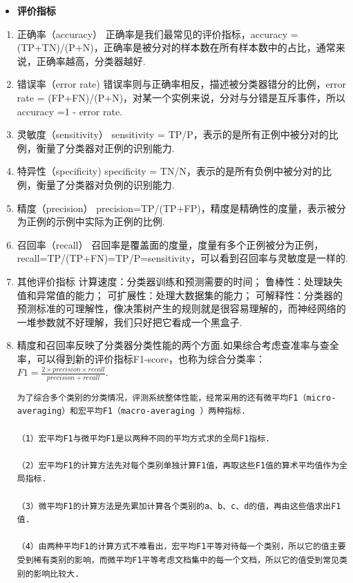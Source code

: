 \begin{itemize}
\item
  \textbf{评价指标}
\end{itemize}

\begin{enumerate}
\def\labelenumi{\arabic{enumi})}
\item
  正确率（accuracy） 正确率是我们最常见的评价指标，accuracy =
  (TP+TN)/(P+N)，正确率是被分对的样本数在所有样本数中的占比，通常来说，正确率越高，分类器越好.
\item
  错误率（error rate)
  错误率则与正确率相反，描述被分类器错分的比例，error rate =
  (FP+FN)/(P+N)，对某一个实例来说，分对与分错是互斥事件，所以accuracy =1
  - error rate.
\item
  灵敏度（sensitivity） sensitivity =
  TP/P，表示的是所有正例中被分对的比例，衡量了分类器对正例的识别能力.
\item
  特异性（specificity) specificity =
  TN/N，表示的是所有负例中被分对的比例，衡量了分类器对负例的识别能力.
\item
  精度（precision）
  precision=TP/(TP+FP)，精度是精确性的度量，表示被分为正例的示例中实际为正例的比例.
\item
  召回率（recall）
  召回率是覆盖面的度量，度量有多个正例被分为正例，recall=TP/(TP+FN)=TP/P=sensitivity，可以看到召回率与灵敏度是一样的.
\item
  其他评价指标 计算速度：分类器训练和预测需要的时间；
  鲁棒性：处理缺失值和异常值的能力； 可扩展性：处理大数据集的能力；
  可解释性：分类器的预测标准的可理解性，像决策树产生的规则就是很容易理解的，而神经网络的一堆参数就不好理解，我们只好把它看成一个黑盒子.
\item
  精度和召回率反映了分类器分类性能的两个方面.如果综合考虑查准率与查全率，可以得到新的评价指标F1-score，也称为综合分类率：$F1=\frac{2 \times precision \times recall}{precision + recall}​$.

\begin{verbatim}
为了综合多个类别的分类情况，评测系统整体性能，经常采用的还有微平均F1（micro-averaging）和宏平均F1（macro-averaging ）两种指标.

（1）宏平均F1与微平均F1是以两种不同的平均方式求的全局F1指标.

（2）宏平均F1的计算方法先对每个类别单独计算F1值，再取这些F1值的算术平均值作为全局指标.

（3）微平均F1的计算方法是先累加计算各个类别的a、b、c、d的值，再由这些值求出F1值.

（4）由两种平均F1的计算方式不难看出，宏平均F1平等对待每一个类别，所以它的值主要受到稀有类别的影响，而微平均F1平等考虑文档集中的每一个文档，所以它的值受到常见类别的影响比较大.
\end{verbatim}
\end{enumerate}

